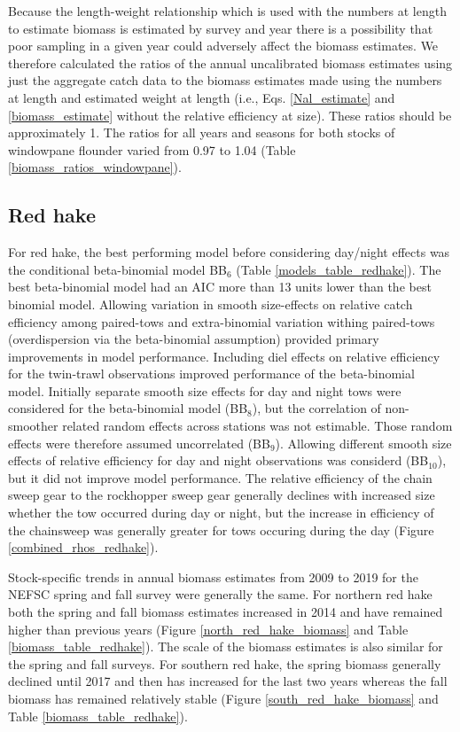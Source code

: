 \documentclass[]{article}
\begin{document}
Because the length-weight relationship which is used with the numbers at
length to estimate biomass is estimated by survey and year there is a
possibility that poor sampling in a given year could adversely affect
the biomass estimates. We therefore calculated the ratios of the annual
uncalibrated biomass estimates using just the aggregate catch data to
the biomass estimates made using the numbers at length and estimated
weight at length (i.e., Eqs. \ref{Nal_estimate} and
\ref{biomass_estimate} without the relative efficiency at size). These
ratios should be approximately 1. The ratios for all years and seasons
for both stocks of windowpane flounder varied from 0.97 to 1.04 (Table
\ref{biomass_ratios_windowpane}).

\hypertarget{red-hake}{%
\subsection{Red hake}\label{red-hake}}

For red hake, the best performing model before considering day/night
effects was the conditional beta-binomial model BB\(_6\) (Table
\ref{models_table_redhake}). The best beta-binomial model had an AIC
more than 13 units lower than the best binomial model. Allowing
variation in smooth size-effects on relative catch efficiency among
paired-tows and extra-binomial variation withing paired-tows
(overdispersion via the beta-binomial assumption) provided primary
improvements in model performance. Including diel effects on relative
efficiency for the twin-trawl observations improved performance of the
beta-binomial model. Initially separate smooth size effects for day and
night tows were considered for the beta-binomial model (BB\(_8\)), but
the correlation of non-smoother related random effects across stations
was not estimable. Those random effects were therefore assumed
uncorrelated (BB\(_9\)). Allowing different smooth size effects of
relative efficiency for day and night observations was considerd
(BB\(_{10}\)), but it did not improve model performance. The relative
efficiency of the chain sweep gear to the rockhopper sweep gear
generally declines with increased size whether the tow occurred during
day or night, but the increase in efficiency of the chainsweep was
generally greater for tows occuring during the day (Figure
\ref{combined_rhos_redhake}).

Stock-specific trends in annual biomass estimates from 2009 to 2019 for
the NEFSC spring and fall survey were generally the same. For northern
red hake both the spring and fall biomass estimates increased in 2014
and have remained higher than previous years (Figure
\ref{north_red_hake_biomass} and Table \ref{biomass_table_redhake}). The
scale of the biomass estimates is also similar for the spring and fall
surveys. For southern red hake, the spring biomass generally declined
until 2017 and then has increased for the last two years whereas the
fall biomass has remained relatively stable (Figure
\ref{south_red_hake_biomass} and Table \ref{biomass_table_redhake}).
\end{document}
